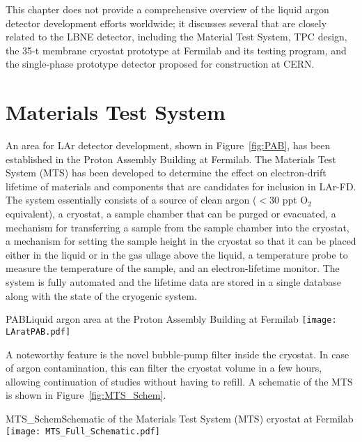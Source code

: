 This chapter does not provide a comprehensive overview of the liquid argon detector development
efforts worldwide; it discusses several that are closely related to the LBNE detector, including the Material
Test System, TPC design, the 35-t membrane cryostat prototype at Fermilab and its testing program, 
and the single-phase prototype detector proposed for construction at CERN.


\section{Materials Test System}
\label{sec:mts}


An area for LAr detector development, shown in Figure~\ref{fig:PAB}, has been established in the Proton Assembly Building at Fermilab. The Materials Test System (MTS) has been developed to determine the effect on electron-drift lifetime of materials and components that are candidates for 
inclusion in LAr-FD. The system essentially consists 
of a source of clean argon ($<30$ ppt O$_{2}$ equivalent), a cryostat, a sample chamber that can be purged or evacuated,  a mechanism for transferring a sample from the sample chamber into the cryostat, a mechanism for setting the sample height in the cryostat so that it can be placed either in the liquid or in the gas ullage above the liquid, a temperature probe to measure the temperature of the sample, and an electron-lifetime monitor. The system is fully automated and the lifetime data are stored in a single database along with the state of the cryogenic system. 

\begin{cdrfigure}{PAB}{Liquid argon area at the Proton Assembly Building at Fermilab}
\texttt{[image: LAratPAB.pdf]}
\end{cdrfigure}

A noteworthy feature is the novel bubble-pump filter inside the cryostat. In case of argon contamination, this can filter the cryostat volume in a few hours, allowing continuation of studies 
 without having to refill. A schematic of the MTS is shown in Figure~\ref{fig:MTS_Schem}.

\begin{cdrfigure}{MTS_Schem}{Schematic of the Materials Test System (MTS) cryostat at Fermilab}
\texttt{[image: MTS\_Full\_Schematic.pdf]}
\end{cdrfigure}

